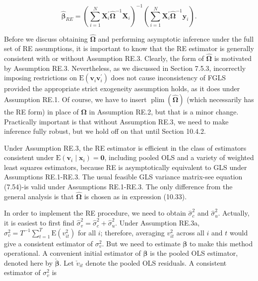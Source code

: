 \documentclass[10pt]{article}
\begin{document}
\begin{equation*}
\hat{\boldsymbol{\beta}}_{R E}=\left(\sum_{i=1}^{N} \mathbf{X}_{i}^{\prime} \hat{\boldsymbol{\Omega}}^{-1} \mathbf{X}_{i}\right)^{-1}\left(\sum_{i=1}^{N} \mathbf{X}_{i}^{\prime} \hat{\boldsymbol{\Omega}}^{-1} \mathbf{y}_{i}\right) . \tag{10.34}
\end{equation*}


Before we discuss obtaining $\hat{\boldsymbol{\Omega}}$ and performing asymptotic inference under the full set of RE assumptions, it is important to know that the RE estimator is generally consistent with or without Assumption RE.3. Clearly, the form of $\hat{\boldsymbol{\Omega}}$ is motivated by Assumption RE.3. Nevertheless, as we discussed in Section 7.5.3, incorrectly imposing restrictions on $\mathrm{E}\left(\mathbf{v}_{i} \mathbf{v}_{i}^{\prime}\right)$ does not cause inconsistency of FGLS provided the appropriate strict exogeneity assumption holds, as it does under Assumption RE.1. Of course, we have to insert $\operatorname{plim}(\hat{\boldsymbol{\Omega}})$ (which necessarily has the RE form) in place of $\boldsymbol{\Omega}$ in Assumption RE.2, but that is a minor change. Practically important is that without Assumption RE.3, we need to make inference fully robust, but we hold off on that until Section 10.4.2.

Under Assumption RE.3, the RE estimator is efficient in the class of estimators consistent under $\mathrm{E}\left(\mathbf{v}_{i} \mid \mathbf{x}_{i}\right)=\mathbf{0}$, including pooled OLS and a variety of weighted least squares estimators, because RE is asymptotically equivalent to GLS under Assumptions RE.1-RE.3. The usual feasible GLS variance matrix-see equation (7.54)-is valid under Assumptions RE.1-RE.3. The only difference from the general analysis is that $\hat{\boldsymbol{\Omega}}$ is chosen as in expression (10.33).

In order to implement the RE procedure, we need to obtain $\hat{\sigma}_{c}^{2}$ and $\hat{\sigma}_{u}^{2}$. Actually, it is easiest to first find $\hat{\sigma}_{v}^{2}=\hat{\sigma}_{c}^{2}+\hat{\sigma}_{u}^{2}$. Under Assumption RE.3a, $\sigma_{v}^{2}=T^{-1} \sum_{t=1}^{T} \mathrm{E}\left(v_{i t}^{2}\right)$ for all $i$; therefore, averaging $v_{i t}^{2}$ across all $i$ and $t$ would give a consistent estimator of $\sigma_{v}^{2}$. But we need to estimate $\boldsymbol{\beta}$ to make this method operational. A convenient initial estimator of $\boldsymbol{\beta}$ is the pooled OLS estimator, denoted here by $\check{\boldsymbol{\beta}}$. Let $\check{v}_{i t}$ denote the pooled OLS residuals. A consistent estimator of $\sigma_{v}^{2}$ is
\end{document}
